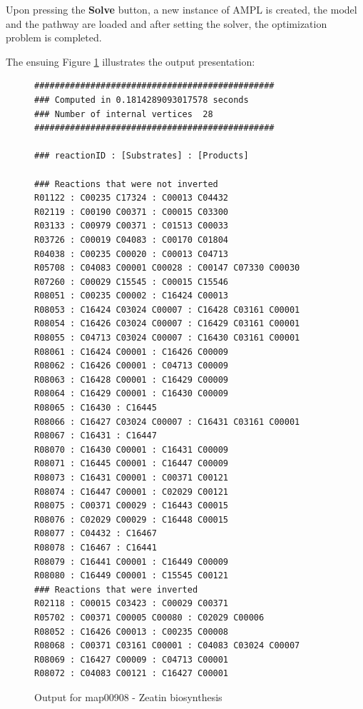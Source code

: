 Upon pressing the \textbf{Solve} button, a new instance of AMPL is created, the model and the pathway are loaded and after setting the solver, the optimization problem is completed. 

The ensuing Figure \ref{fig:output-map00908} illustrates the output presentation:

\begin{figure}[H]
    \centering
    \begin{framed}
    \begin{small}
    \begin{verbatim}
###############################################
### Computed in 0.1814289093017578 seconds
### Number of internal vertices  28
###############################################

### reactionID : [Substrates] : [Products]

### Reactions that were not inverted
R01122 : C00235 C17324 : C00013 C04432
R02119 : C00190 C00371 : C00015 C03300
R03133 : C00979 C00371 : C01513 C00033
R03726 : C00019 C04083 : C00170 C01804
R04038 : C00235 C00020 : C00013 C04713
R05708 : C04083 C00001 C00028 : C00147 C07330 C00030
R07260 : C00029 C15545 : C00015 C15546
R08051 : C00235 C00002 : C16424 C00013
R08053 : C16424 C03024 C00007 : C16428 C03161 C00001
R08054 : C16426 C03024 C00007 : C16429 C03161 C00001
R08055 : C04713 C03024 C00007 : C16430 C03161 C00001
R08061 : C16424 C00001 : C16426 C00009
R08062 : C16426 C00001 : C04713 C00009
R08063 : C16428 C00001 : C16429 C00009
R08064 : C16429 C00001 : C16430 C00009
R08065 : C16430 : C16445
R08066 : C16427 C03024 C00007 : C16431 C03161 C00001
R08067 : C16431 : C16447
R08070 : C16430 C00001 : C16431 C00009
R08071 : C16445 C00001 : C16447 C00009
R08073 : C16431 C00001 : C00371 C00121
R08074 : C16447 C00001 : C02029 C00121
R08075 : C00371 C00029 : C16443 C00015
R08076 : C02029 C00029 : C16448 C00015
R08077 : C04432 : C16467
R08078 : C16467 : C16441
R08079 : C16441 C00001 : C16449 C00009
R08080 : C16449 C00001 : C15545 C00121
### Reactions that were inverted
R02118 : C00015 C03423 : C00029 C00371
R05702 : C00371 C00005 C00080 : C02029 C00006
R08052 : C16426 C00013 : C00235 C00008
R08068 : C00371 C03161 C00001 : C04083 C03024 C00007
R08069 : C16427 C00009 : C04713 C00001
R08072 : C04083 C00121 : C16427 C00001
    \end{verbatim}
    \end{small}
    \end{framed}
    \caption{Output for map00908 - Zeatin biosynthesis}
    \label{fig:output-map00908}
\end{figure}

